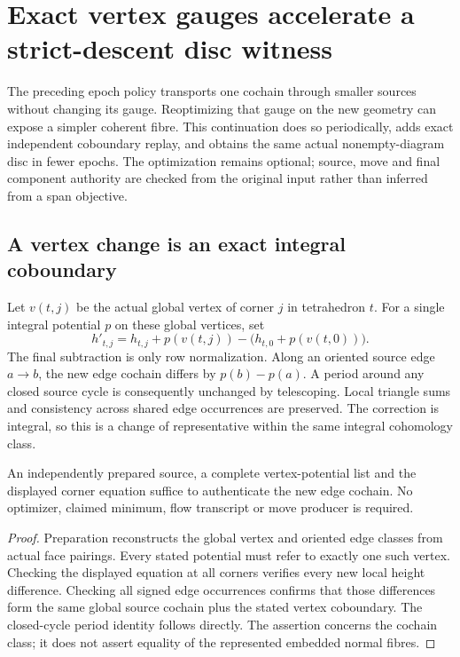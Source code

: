 \section{Exact vertex gauges accelerate a strict-descent disc witness}
\label{sec:epoch-gauge}

The preceding epoch policy transports one cochain through smaller sources
without changing its gauge. Reoptimizing that gauge on the new geometry
can expose a simpler coherent fibre. This continuation does so periodically,
adds exact independent coboundary replay, and obtains the same actual
nonempty-diagram disc in fewer epochs. The optimization remains optional;
source, move and final component authority are checked from the original
input rather than inferred from a span objective.

\subsection{A vertex change is an exact integral coboundary}

Let $v(t,j)$ be the actual global vertex of corner $j$ in tetrahedron $t$.
For a single integral potential $p$ on these global vertices, set
\[
 h'_{t,j}=h_{t,j}+p(v(t,j))-
                         \bigl(h_{t,0}+p(v(t,0))\bigr).
\]
The final subtraction is only row normalization. Along an oriented source
edge $a\to b$, the new edge cochain differs by $p(b)-p(a)$. A period around
any closed source cycle is consequently unchanged by telescoping. Local
triangle sums and consistency across shared edge occurrences are preserved.
The correction is integral, so this is a change of representative within
the same integral cohomology class.

\begin{proposition}
An independently prepared source, a complete vertex-potential list and the
displayed corner equation suffice to authenticate the new edge cochain.
No optimizer, claimed minimum, flow transcript or move producer is required.
\end{proposition}
\begin{proof}
Preparation reconstructs the global vertex and oriented edge classes from
actual face pairings. Every stated potential must refer to exactly one such
vertex. Checking the displayed equation at all corners verifies every
new local height difference. Checking all signed edge occurrences confirms
that those differences form the same global source cochain plus the stated
vertex coboundary. The closed-cycle period identity follows directly.
The assertion concerns the cochain class; it does not assert equality of
the represented embedded normal fibres.
\end{proof}

